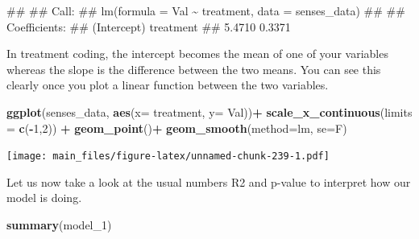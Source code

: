 \documentclass[
]{book}
\newenvironment{Shaded}{\begin{snugshade}}{\end{snugshade}}
\newcommand{\AttributeTok}[1]{\textcolor[rgb]{0.13,0.29,0.53}{#1}}
\newcommand{\DecValTok}[1]{\textcolor[rgb]{0.00,0.00,0.81}{#1}}
\newcommand{\FunctionTok}[1]{\textcolor[rgb]{0.13,0.29,0.53}{\textbf{#1}}}
\newcommand{\NormalTok}[1]{#1}
\newcommand{\SpecialCharTok}[1]{\textcolor[rgb]{0.81,0.36,0.00}{\textbf{#1}}}
\newcommand{\StringTok}[1]{\textcolor[rgb]{0.31,0.60,0.02}{#1}}
\begin{document}
\begin{Shaded}
\begin{Highlighting}[]
\NormalTok{\#\# }
\NormalTok{\#\# Call:}
\NormalTok{\#\# lm(formula = Val \textasciitilde{} treatment, data = senses\_data)}
\NormalTok{\#\# }
\NormalTok{\#\# Coefficients:}
\NormalTok{\#\# (Intercept)    treatment  }
\NormalTok{\#\#      5.4710       0.3371}
\end{Highlighting}
\end{Shaded}

In treatment coding, the intercept becomes the mean of one of your variables whereas the slope is the difference between the two means. You can see this clearly once you plot a linear function between the two variables.

\begin{Shaded}
\begin{Highlighting}[]
\FunctionTok{ggplot}\NormalTok{(senses\_data, }\FunctionTok{aes}\NormalTok{(}\AttributeTok{x=}\NormalTok{ treatment, }\AttributeTok{y=}\NormalTok{ Val))}\SpecialCharTok{+}
  \FunctionTok{scale\_x\_continuous}\NormalTok{(}\AttributeTok{limits =} \FunctionTok{c}\NormalTok{(}\SpecialCharTok{{-}}\DecValTok{1}\NormalTok{,}\DecValTok{2}\NormalTok{)) }\SpecialCharTok{+}
  \FunctionTok{geom\_point}\NormalTok{()}\SpecialCharTok{+}
  \FunctionTok{geom\_smooth}\NormalTok{(}\AttributeTok{method=}\StringTok{\textquotesingle{}lm\textquotesingle{}}\NormalTok{, }\AttributeTok{se=}\NormalTok{F)}
\end{Highlighting}
\end{Shaded}

\texttt{[image: main\_files/figure-latex/unnamed-chunk-239-1.pdf]}

Let us now take a look at the usual numbers R2 and p-value to interpret how our model is doing.

\begin{Shaded}
\begin{Highlighting}[]
\FunctionTok{summary}\NormalTok{(model\_1)}
\end{Highlighting}
\end{Shaded}
\end{document}
